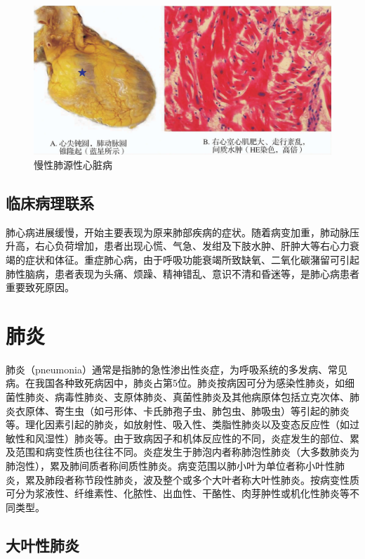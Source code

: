 \begin{figure}[!htbp]
 \centering
 \includegraphics{./images/Image00115.jpg}
 \captionsetup{justification=centering}
 \caption{慢性肺源性心脏病}
 \label{fig7-6}
  \end{figure} 

\subsection{临床病理联系}

肺心病进展缓慢，开始主要表现为原来肺部疾病的症状。随着病变加重，肺动脉压升高，右心负荷增加，患者出现心慌、气急、发绀及下肢水肿、肝肿大等右心力衰竭的症状和体征。重症肺心病，由于呼吸功能衰竭所致缺氧、二氧化碳潴留可引起肺性脑病，患者表现为头痛、烦躁、精神错乱、意识不清和昏迷等，是肺心病患者重要致死原因。

\section{肺炎}

肺炎（pneumonia）通常是指肺的急性渗出性炎症，为呼吸系统的多发病、常见病。在我国各种致死病因中，肺炎占第5位。肺炎按病因可分为感染性肺炎，如细菌性肺炎、病毒性肺炎、支原体肺炎、真菌性肺炎及其他病原体包括立克次体、肺炎衣原体、寄生虫（如弓形体、卡氏肺孢子虫、肺包虫、肺吸虫）等引起的肺炎等。理化因素引起的肺炎，如放射性、吸入性、类脂性肺炎以及变态反应性（如过敏性和风湿性）肺炎等。由于致病因子和机体反应性的不同，炎症发生的部位、累及范围和病变性质也往往不同。炎症发生于肺泡内者称肺泡性肺炎（大多数肺炎为肺泡性），累及肺间质者称间质性肺炎。病变范围以肺小叶为单位者称小叶性肺炎，累及肺段者称节段性肺炎，波及整个或多个大叶者称大叶性肺炎。按病变性质可分为浆液性、纤维素性、化脓性、出血性、干酪性、肉芽肿性或机化性肺炎等不同类型。

\subsection{大叶性肺炎}

